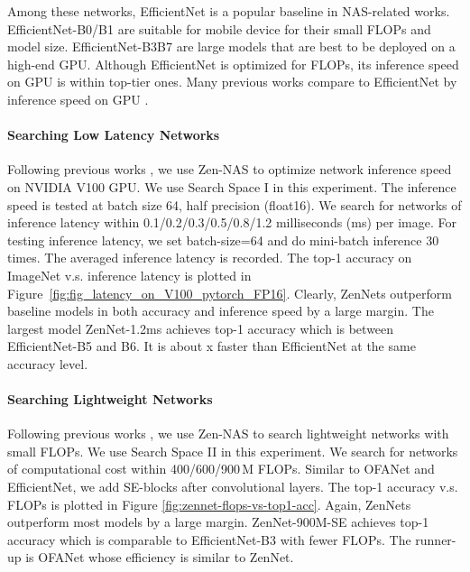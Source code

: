 \documentclass{article}
\providecommand{\citep}{\cite}
\begin{document}
Among these networks, EfficientNet is a popular baseline in NAS-related works. EfficientNet-B0/B1 are suitable for mobile device for their small FLOPs and model size. EfficientNet-B3B7 are large models that are best to be deployed on a high-end GPU. Although EfficientNet is optimized for FLOPs, its inference speed on GPU is within top-tier ones. Many previous works compare to EfficientNet by inference speed on GPU \citep{zhangResNeStSplitAttentionNetworks2020,caiOnceforAllTrainOne2020,radosavovicDesigningNetworkDesign2020}.

\paragraph{Searching Low Latency Networks}
Following previous works \citep{caiOnceforAllTrainOne2020,liPartialOrderPruning2019,radosavovicDesigningNetworkDesign2020}, we use Zen-NAS to optimize network inference speed on NVIDIA V100 GPU. We use Search Space I in this experiment. The inference speed is tested at batch size 64, half precision (float16). We search for networks of inference latency within 0.1/0.2/0.3/0.5/0.8/1.2 milliseconds (ms) per image. For testing inference latency, we set batch-size=64 and do mini-batch inference 30 times. The averaged inference latency is recorded. The top-1 accuracy on ImageNet v.s. inference latency is plotted in Figure~\ref{fig:fig_latency_on_V100_pytorch_FP16}. Clearly, ZenNets outperform baseline models in both accuracy and inference speed by a large margin. The largest model ZenNet-1.2ms achieves  top-1 accuracy which is between EfficientNet-B5 and B6. It is about x faster than EfficientNet at the same accuracy level.

\paragraph{Searching Lightweight Networks}
Following previous works \cite{caiOnceforAllTrainOne2020,tanEfficientNetRethinkingModel2019}, we use Zen-NAS to search lightweight networks with small FLOPs. We use Search Space II in this experiment. We search for networks of computational cost within 400/600/900\,M FLOPs.  Similar to OFANet and EfficientNet, we add SE-blocks after convolutional layers. The top-1 accuracy v.s. FLOPs is plotted in Figure \ref{fig:zennet-flops-vs-top1-acc}. Again, ZenNets outperform most models by a large margin. ZenNet-900M-SE achieves  top-1 accuracy which is comparable to EfficientNet-B3 with  fewer FLOPs. The runner-up is OFANet whose efficiency is similar to ZenNet. 
\end{document}
